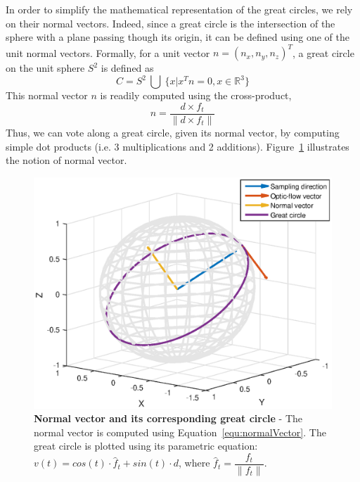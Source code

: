 In order to simplify the mathematical representation of the great circles, we rely on their normal vectors. Indeed, since a great circle is the intersection of the sphere with a plane passing though its origin, it can be defined using one of the unit normal vectors.
Formally, for a unit vector $n = (n_x, n_y, n_z)^T$, a great circle on the unit sphere $S^2$ is defined as
\begin{equation}
C = S^2~\bigcup~\{ x|x^Tn = 0, x \in \mathbb{R}^3 \}
\end{equation}
This normal vector $n$ is readily computed using the cross-product,
\begin{equation}
n = \dfrac{d \times f_t}{\|d \times f_t\|}
\label{equ:normalVector}
\end{equation}
Thus, we can vote along a great circle, given its normal vector, by computing simple dot products (i.e. 3 multiplications and 2 additions). Figure~\ref{fig:normalVector} illustrates the notion of normal vector.

\begin{figure}
\centering
\includegraphics[width=0.7\linewidth]{images/matlab/normalVector}
\caption{\textbf{Normal vector and its corresponding great circle} - The normal vector is computed using Equation~\ref{equ:normalVector}. The great circle is plotted using its parametric equation: $v(t) = cos(t) \cdot \hat{f}_t + sin(t) \cdot d$, where $\hat{f}_t = \dfrac{f_t}{\|f_t\|}$. \label{fig:normalVector}}
\end{figure}

